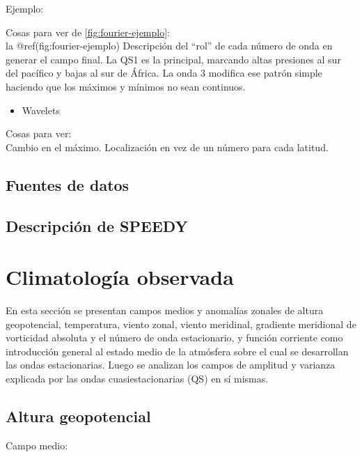 \documentclass[spanish,a4paper,12pt,oneside]{book}
\providecommand{\tightlist}{%
  \setlength{\itemsep}{0pt}\setlength{\parskip}{0pt}}
\begin{document}

Ejemplo:

Cosas para ver de \autoref{fig:fourier-ejemplo}:\\
la @ref(fig:fourier-ejemplo) Descripción del ``rol'' de cada número de
onda en generar el campo final. La QS1 es la principal, marcando altas
presiones al sur del pacífico y bajas al sur de África. La onda 3
modifica ese patrón simple haciendo que los máximos y mínimos no sean
continuos.

\begin{itemize}
\tightlist
\item
  Wavelets
\end{itemize}

Cosas para ver:\\
Cambio en el máximo. Localización en vez de un número para cada latitud.

\section{Fuentes de datos}\label{fuentes-de-datos}

\section{Descripción de SPEEDY}\label{descripcion-de-speedy}

\chapter{Climatología observada}\label{climatologia-observada}

En esta sección se presentan campos medios y anomalías zonales de altura
geopotencial, temperatura, viento zonal, viento meridinal, gradiente
meridional de vorticidad absoluta y el número de onda estacionario, y
función corriente como introducción general al estado medio de la
atmósfera sobre el cual se desarrollan las ondas estacionarias. Luego se
analizan los campos de amplitud y varianza explicada por las ondas
cuasiestacionarias (QS) en sí mismas.

\section{Altura geopotencial}\label{altura-geopotencial}

Campo medio:

\printbibliography
\end{document}
